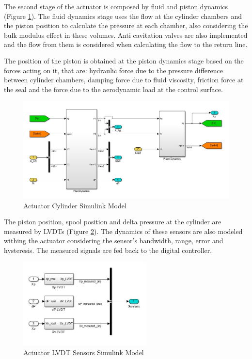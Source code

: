 The second stage of the actuator is composed by fluid and piston dynamics (Figure \ref{fig:3_2_Cylinder}). The fluid dynamics stage uses the flow at the cylinder chambers and the piston position to calculate the pressure at each chamber, also considering the bulk modulus effect in these volumes. Anti cavitation valves are also implemented and the flow from them is considered when calculating the flow to the return line.

The position of the piston is obtained at the piston dynamics stage based on the forces acting on it, that are: hydraulic force due to the pressure difference between cylinder chambers, damping force due to fluid viscosity, friction force at the seal and the force due to the aerodynamic load at the control surface.

\begin{figure}[H]
	\centering
	\centerline{\includegraphics[width=1.1\textwidth]{Figuras/3.ActuationSystemModel/3-2-Cylinder.jpg}}
	\caption{Actuator Cylinder Simulink Model}
	\label{fig:3_2_Cylinder}
\end{figure}

The piston position, spool position and delta pressure at the cylinder are measured by LVDTs (Figure \ref{fig:3_2_Sensors}). The dynamics of these sensors are also modeled withing the actuator considering the sensor's bandwidth, range, error and hysteresis. The measured signals are fed back to the digital controller.

\begin{figure}[H]
	\centering
	\centerline{\includegraphics[width=0.6\textwidth]{Figuras/3.ActuationSystemModel/3-2-Sensors.jpg}}
	\caption{Actuator LVDT Sensors Simulink Model}
	\label{fig:3_2_Sensors}
\end{figure}

